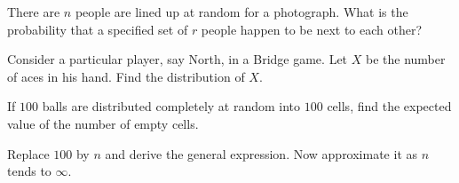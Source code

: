 \begin{problem}[Handout 1, \# 13]
  There are \(n\) people are lined up at random for a photograph. What is
  the probability that a specified set of \(r\) people happen to be next to
  each other?
\end{problem}
\begin{solution}
\end{solution}

\begin{problem}[Handout 1, \# 16]
  Consider a particular player, say North, in a Bridge game. Let \(X\) be
  the number of aces in his hand. Find the distribution of \(X\).
\end{problem}
\begin{solution}
\end{solution}

\begin{problem}[Handout 1, \# 20]
  If \(100\) balls are distributed completely at random into \(100\) cells,
  find the expected value of the number of empty cells.

  \noindent Replace \(100\) by \(n\) and derive the general expression. Now
  approximate it as \(n\) tends to \(\infty\).
\end{problem}
\begin{solution}
\end{solution}

